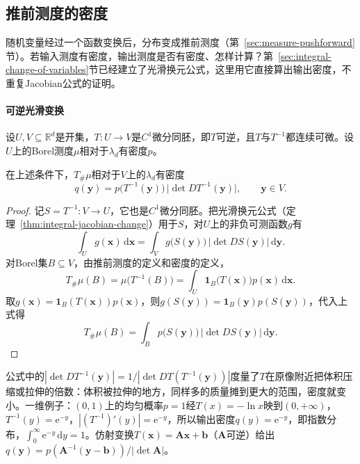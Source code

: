 \subsection{推前测度的密度}
\label{sec:density-pushforward}

随机变量经过一个函数变换后，分布变成推前测度（第~\ref{sec:measure-pushforward}节）。若输入测度有密度，输出测度是否有密度、怎样计算？第~\ref{sec:integral-change-of-variables}节已经建立了光滑换元公式，这里用它直接算出输出密度，不重复Jacobian公式的证明。

\paragraph{可逆光滑变换}
设$U,V\subseteq\mathbb R^d$是开集，$T:U\to V$是$C^1$微分同胚，即$T$可逆，且$T$与$T^{-1}$都连续可微。设$U$上的Borel测度$\mu$相对于$\lambda_d$有密度$p$。

\begin{theorem}[推前测度的密度]
\label{thm:density-pushforward}
在上述条件下，$T_\#\mu$相对于$V$上的$\lambda_d$有密度
\[
 q(\bm y)=p\bigl(T^{-1}(\bm y)\bigr)\,\bigl|\det DT^{-1}(\bm y)\bigr|,\qquad \bm y\in V .
\]
\end{theorem}

\begin{proof}
记$S=T^{-1}:V\to U$，它也是$C^1$微分同胚。把光滑换元公式（定理~\ref{thm:integral-jacobian-change}）用于$S$，对$U$上的非负可测函数$g$有
\[
 \int_Ug(\bm x)\,\mathrm d\bm x=\int_Vg\bigl(S(\bm y)\bigr)\,\bigl|\det DS(\bm y)\bigr|\,\mathrm d\bm y .
\]
对Borel集$B\subseteq V$，由推前测度的定义和密度的定义，
\[
 T_\#\mu(B)=\mu\bigl(T^{-1}(B)\bigr)=\int_U\mathbf 1_B\bigl(T(\bm x)\bigr)p(\bm x)\,\mathrm d\bm x .
\]
取$g(\bm x)=\mathbf 1_B(T(\bm x))p(\bm x)$，则$g(S(\bm y))=\mathbf 1_B(\bm y)p(S(\bm y))$，代入上式得
\[
 T_\#\mu(B)=\int_Bp\bigl(S(\bm y)\bigr)\,\bigl|\det DS(\bm y)\bigr|\,\mathrm d\bm y .
\]
\end{proof}

公式中的$|\det DT^{-1}(\bm y)|=1/|\det DT(T^{-1}(\bm y))|$度量了$T$在原像附近把体积压缩或拉伸的倍数：体积被拉伸的地方，同样多的质量摊到更大的范围，密度就变小。一维例子：$(0,1)$上的均匀概率$p=1$经$T(x)=-\ln x$映到$(0,+\infty)$，$T^{-1}(y)=\mathrm e^{-y}$，$|(T^{-1})'(y)|=\mathrm e^{-y}$，所以输出密度$q(y)=\mathrm e^{-y}$，即指数分布，$\int_0^\infty\mathrm e^{-y}\,\mathrm dy=1$。仿射变换$T(\bm x)=\bm A\bm x+\bm b$（$\bm A$可逆）给出$q(\bm y)=p(\bm A^{-1}(\bm y-\bm b))/|\det\bm A|$。

